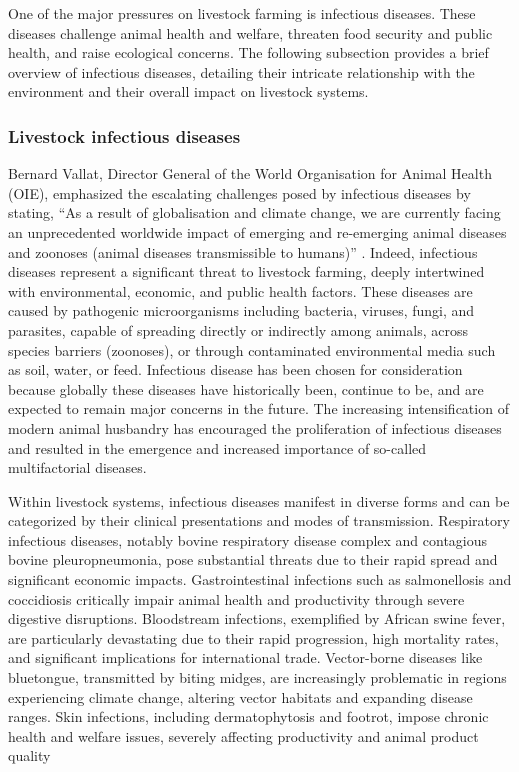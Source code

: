 One of the major pressures on livestock farming is infectious diseases. These diseases challenge animal health and welfare, threaten food security and public health, and raise ecological concerns. The following subsection provides a brief overview of infectious diseases, detailing their intricate relationship with the environment and their overall impact on livestock systems.


\subsubsection{Livestock infectious diseases}

Bernard Vallat, Director General of the World Organisation for Animal Health (OIE), emphasized the escalating challenges posed by infectious diseases by stating, “As a result of globalisation and climate change, we are currently facing an unprecedented worldwide impact of emerging and re-emerging animal diseases and zoonoses (animal diseases transmissible to humans)” \cite{vallat2007protecting}. Indeed, infectious diseases represent a significant threat to livestock farming, deeply intertwined with environmental, economic, and public health factors. These diseases are caused by pathogenic microorganisms including bacteria, viruses, fungi, and parasites, capable of spreading directly or indirectly among animals, across species barriers (zoonoses), or through contaminated environmental media such as soil, water, or feed. Infectious disease has been chosen for consideration because globally these diseases have historically been, continue to be, and are expected to remain major concerns in the future. The increasing intensification of modern animal husbandry has encouraged the proliferation of infectious diseases and resulted in the emergence and increased importance of so-called multifactorial diseases.

Within livestock systems, infectious diseases manifest in diverse forms and can be categorized by their clinical presentations and modes of transmission. Respiratory infectious diseases, notably bovine respiratory disease complex and contagious bovine pleuropneumonia, pose substantial threats due to their rapid spread and significant economic impacts. Gastrointestinal infections such as salmonellosis and coccidiosis critically impair animal health and productivity through severe digestive disruptions. Bloodstream infections, exemplified by African swine fever, are particularly devastating due to their rapid progression, high mortality rates, and significant implications for international trade. Vector-borne diseases like bluetongue, transmitted by biting midges, are increasingly problematic in regions experiencing climate change, altering vector habitats and expanding disease ranges. Skin infections, including dermatophytosis and footrot, impose chronic health and welfare issues, severely affecting productivity and animal product quality \cite{gilbert2024quantifying}

